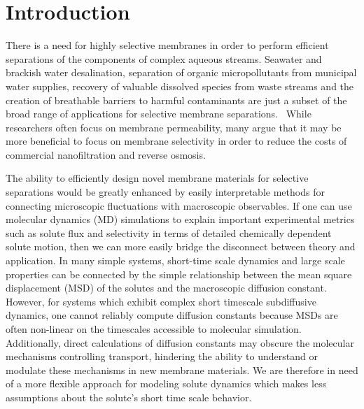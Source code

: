 \documentclass[journal=jpcbfk,manuscript=article]{achemso}
\begin{document}
  \section{Introduction}
  
  There is a need for highly selective membranes in order to perform efficient 
  separations of the components of complex aqueous streams. Seawater and
  brackish water desalination, separation of organic micropollutants from 
  municipal water supplies, recovery of valuable dissolved species from 
  waste streams and the creation of breathable barriers to harmful contaminants are just a
  subset of the broad range of applications for selective membrane separations.~\cite{fritzmann_state---art_2007,fonseca_couto_critical_2018,dischinger_evaluation_2019,ramaseshan_functionalized_2006}
  While researchers often focus on membrane permeability, many argue that
  it may be more beneficial to focus on membrane selectivity in order to 
  reduce the costs of commercial nanofiltration and reverse osmosis.~\cite{werber_materials_2016}
  
  The ability to efficiently design novel membrane materials for selective separations 
  would be greatly enhanced by easily interpretable methods for connecting microscopic
  fluctuations with macroscopic observables. If one can use molecular dynamics (MD)
  simulations to explain important experimental metrics such as solute flux and 
  selectivity in terms of detailed chemically dependent solute motion, then we can 
  more easily bridge the disconnect between theory and application. In many simple 
  systems, short-time scale dynamics and large scale properties can be connected by
  the simple relationship between the mean square displacement (MSD) of the solutes
  and the macroscopic diffusion constant. However, for systems which exhibit complex 
  short timescale subdiffusive dynamics, one cannot reliably compute diffusion 
  constants because MSDs are often non-linear on the timescales accessible to molecular
  simulation. Additionally, direct calculations of diffusion constants may obscure the
  molecular mechanisms controlling transport, hindering the ability to understand or 
  modulate these mechanisms in new membrane materials. We are therefore in need of a 
  more flexible approach for modeling solute dynamics which makes less assumptions 
  about the solute's short time scale behavior.
\end{document}
